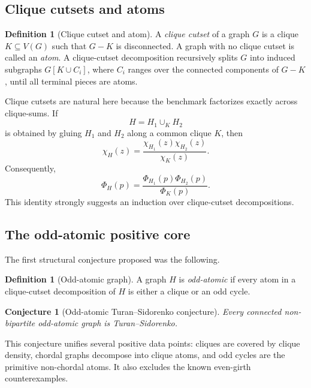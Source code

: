 \documentclass[11pt]{article}
\newtheorem{conjecture}[theorem]{Conjecture}
\theoremstyle{definition}
\newtheorem{definition}[theorem]{Definition}
\begin{document}
\subsection{Clique cutsets and atoms}

\begin{definition}[Clique cutset and atom]
A \emph{clique cutset} of a graph $G$ is a clique $K\subseteq V(G)$ such that $G-K$ is disconnected.  A graph with no clique cutset is called an \emph{atom}.  A clique-cutset decomposition recursively splits $G$ into induced subgraphs $G[K\cup C_i]$, where $C_i$ ranges over the connected components of $G-K$, until all terminal pieces are atoms.
\end{definition}

Clique cutsets are natural here because the benchmark factorizes exactly across clique-sums.  If
\[
  H=H_1\cup_K H_2
\]
is obtained by gluing $H_1$ and $H_2$ along a common clique $K$, then
\begin{equation}\label{eq:chi-clique-sum}
  \chi_H(z)=\frac{\chi_{H_1}(z)\chi_{H_2}(z)}{\chi_K(z)}.
\end{equation}
Consequently,
\begin{equation}\label{eq:Phi-clique-sum}
  \Phi_H(p)=\frac{\Phi_{H_1}(p)\Phi_{H_2}(p)}{\Phi_K(p)}.
\end{equation}
This identity strongly suggests an induction over clique-cutset decompositions.

\subsection{The odd-atomic positive core}

The first structural conjecture proposed was the following.

\begin{definition}[Odd-atomic graph]
A graph $H$ is \emph{odd-atomic} if every atom in a clique-cutset decomposition of $H$ is either a clique or an odd cycle.
\end{definition}

\begin{conjecture}[Odd-atomic Turan--Sidorenko conjecture]\label{conj:odd-atomic}
Every connected non-bipartite odd-atomic graph is Turan--Sidorenko.
\end{conjecture}

This conjecture unifies several positive data points: cliques are covered by clique density, chordal graphs decompose into clique atoms, and odd cycles are the primitive non-chordal atoms.  It also excludes the known even-girth counterexamples.
\end{document}
